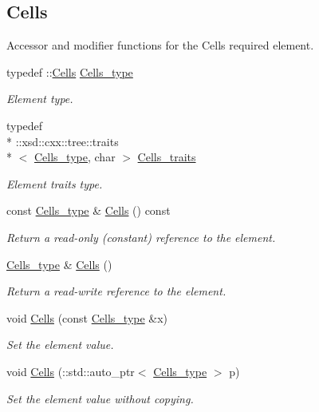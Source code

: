 \subsection*{Cells}
\label{_amgrp56284b76007b9f31cdec47174c4de6af}%
Accessor and modifier functions for the Cells required element. \begin{DoxyCompactItemize}
\item 
typedef \-::\hyperlink{classCells}{Cells} \hyperlink{classPieceUnstructuredGrid__t_aca1ec38eff08bde0cd115c54dbb7a20f}{Cells\-\_\-type}
\begin{DoxyCompactList}\small\item\em Element type. \end{DoxyCompactList}\item 
typedef \\*
\-::xsd\-::cxx\-::tree\-::traits\\*
$<$ \hyperlink{classPieceUnstructuredGrid__t_aca1ec38eff08bde0cd115c54dbb7a20f}{Cells\-\_\-type}, char $>$ \hyperlink{classPieceUnstructuredGrid__t_a33252b6f55b5ae830ceecdf9be42cce1}{Cells\-\_\-traits}
\begin{DoxyCompactList}\small\item\em Element traits type. \end{DoxyCompactList}\item 
const \hyperlink{classPieceUnstructuredGrid__t_aca1ec38eff08bde0cd115c54dbb7a20f}{Cells\-\_\-type} \& \hyperlink{classPieceUnstructuredGrid__t_a398de7c2f319c1785810e18f6b43831e}{Cells} () const 
\begin{DoxyCompactList}\small\item\em Return a read-\/only (constant) reference to the element. \end{DoxyCompactList}\item 
\hyperlink{classPieceUnstructuredGrid__t_aca1ec38eff08bde0cd115c54dbb7a20f}{Cells\-\_\-type} \& \hyperlink{classPieceUnstructuredGrid__t_a49e65eacff6577cd353fa15a09febf86}{Cells} ()
\begin{DoxyCompactList}\small\item\em Return a read-\/write reference to the element. \end{DoxyCompactList}\item 
void \hyperlink{classPieceUnstructuredGrid__t_a366f0cff854ef350eb1be9da22df6d14}{Cells} (const \hyperlink{classPieceUnstructuredGrid__t_aca1ec38eff08bde0cd115c54dbb7a20f}{Cells\-\_\-type} \&x)
\begin{DoxyCompactList}\small\item\em Set the element value. \end{DoxyCompactList}\item 
void \hyperlink{classPieceUnstructuredGrid__t_ab90d26fbc66b1b669b7bfa7a50a6b069}{Cells} (\-::std\-::auto\-\_\-ptr$<$ \hyperlink{classPieceUnstructuredGrid__t_aca1ec38eff08bde0cd115c54dbb7a20f}{Cells\-\_\-type} $>$ p)
\begin{DoxyCompactList}\small\item\em Set the element value without copying. \end{DoxyCompactList}\end{DoxyCompactItemize}
